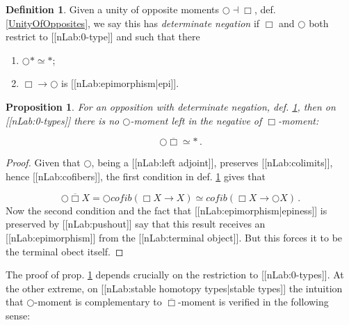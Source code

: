 \documentclass[12pt,titlepage]{article}
\theoremstyle{plain}
\newtheorem{prop}{Proposition}
\theoremstyle{definition}
\newtheorem{defn}{Definition}
\theoremstyle{remark}
\begin{document}
\begin{defn}
\label{CompleteOpposition}\hypertarget{CompleteOpposition}{}
Given a unity of opposite moments $\bigcirc \dashv \Box$, def. \ref{UnityOfOpposites}, we say this has \emph{determinate negation} if $\Box$ and $\bigcirc$ both restrict to [[nLab:0-type]] and such that there

\begin{enumerate}%
\item $\bigcirc \ast \simeq \ast$;


\item $\Box  \longrightarrow \bigcirc$ is [[nLab:epimorphism|epi]].



\end{enumerate}
\end{defn}
\begin{prop}
\label{AccuracyOfNegatives}\hypertarget{AccuracyOfNegatives}{}
For an opposition with determinate negation, def. \ref{CompleteOpposition}, then on [[nLab:0-types]] there is no $\bigcirc$-moment left in the negative of $\Box$-moment:

\begin{displaymath}
\bigcirc \overline{\Box} \simeq \ast
  \,.
\end{displaymath}
\end{prop}
\begin{proof}
Given that $\bigcirc$, being a [[nLab:left adjoint]], preserves [[nLab:colimits]], hence [[nLab:cofibers]], the first condition in def. \ref{CompleteOpposition} gives that

\begin{displaymath}
\bigcirc \overline{\Box} X
  =
  \bigcirc cofib(\Box X \to X)
  \simeq
  cofib(\Box X \to \bigcirc X)
  \,.
\end{displaymath}
Now the second condition and the fact that [[nLab:epimorphism|epiness]] is preserved by [[nLab:pushout]] say that this result receives an [[nLab:epimorphism]] from the [[nLab:terminal object]]. But this forces it to be the terminal obect itself.

\end{proof}
The proof of prop. \ref{AccuracyOfNegatives} depends crucially on the restriction to [[nLab:0-types]]. At the other extreme, on [[nLab:stable homotopy types|stable types]] the intuition that $\bigcirc$-moment is complementary to $\overline{\Box}$-moment is verified in the following sense:
\end{document}
